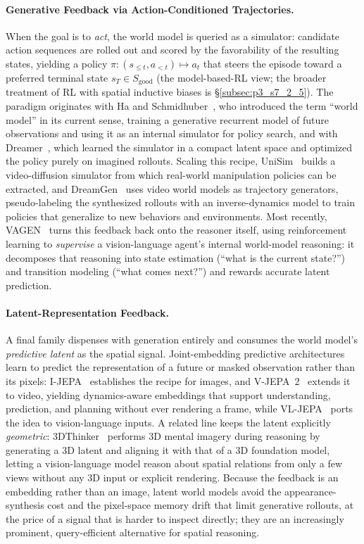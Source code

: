 \paragraph{Generative Feedback via Action-Conditioned Trajectories.}
When the goal is to \emph{act}, the world model is queried as a simulator: candidate action sequences are rolled out and scored by the favorability of the resulting states, yielding a policy $\pi:(s_{\leq t}, a_{<t}) \mapsto a_t$ that steers the episode toward a preferred terminal state $s_T \in S_{\text{good}}$ (the model-based-RL view; the broader treatment of RL with spatial inductive biases is §\ref{subsec:p3_s7_2_5}).
The paradigm originates with Ha and Schmidhuber~\cite{ha2018world}, who introduced the term ``world model'' in its current sense, training a generative recurrent model of future observations and using it as an internal simulator for policy search, and with Dreamer~\cite{hafner2019dreamer}, which learned the simulator in a compact latent space and optimized the policy purely on imagined rollouts.
Scaling this recipe, UniSim~\cite{yang2023learning} builds a video-diffusion simulator from which real-world manipulation policies can be extracted, and DreamGen~\cite{jang2025dreamgen} uses video world models as trajectory generators, pseudo-labeling the synthesized rollouts with an inverse-dynamics model to train policies that generalize to new behaviors and environments.
Most recently, VAGEN~\cite{wang2025vagen} turns this feedback back onto the reasoner itself, using reinforcement learning to \emph{supervise} a vision-language agent's internal world-model reasoning: it decomposes that reasoning into state estimation (``what is the current state?'') and transition modeling (``what comes next?'') and rewards accurate latent prediction.

\paragraph{Latent-Representation Feedback.}
A final family dispenses with generation entirely and consumes the world model's \emph{predictive latent} as the spatial signal.
Joint-embedding predictive architectures learn to predict the representation of a future or masked observation rather than its pixels: I-JEPA~\cite{assran2023jepa} establishes the recipe for images, and V-JEPA~2~\cite{assran2025vjepa} extends it to video, yielding dynamics-aware embeddings that support understanding, prediction, and planning without ever rendering a frame, while VL-JEPA~\cite{chen2025vl} ports the idea to vision-language inputs.
A related line keeps the latent explicitly \emph{geometric}: 3DThinker~\cite{chen20253dthinker} performs 3D mental imagery during reasoning by generating a 3D latent and aligning it with that of a 3D foundation model, letting a vision-language model reason about spatial relations from only a few views without any 3D input or explicit rendering.
Because the feedback is an embedding rather than an image, latent world models avoid the appearance-synthesis cost and the pixel-space memory drift that limit generative rollouts, at the price of a signal that is harder to inspect directly; they are an increasingly prominent, query-efficient alternative for spatial reasoning.


